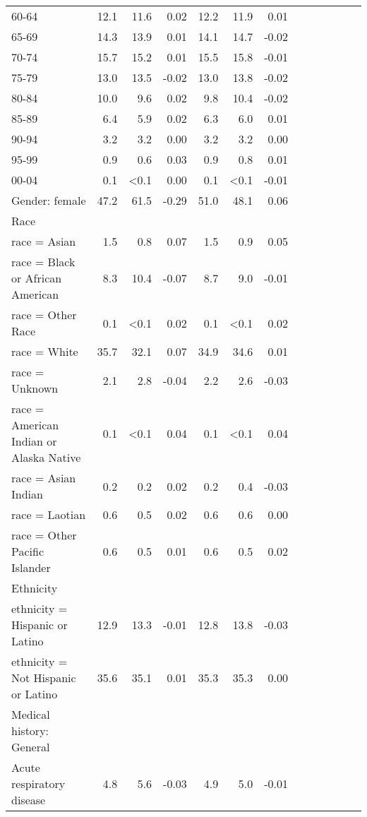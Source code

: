 \documentclass[11pt,]{article}
\begin{document}
\begin{longtable}{lrrrrrrrrrrrr}
      60-64 & 12.1 & 11.6 &  0.02 & 12.2 & 11.9 &  0.01 \\ 
      65-69 & 14.3 & 13.9 &  0.01 & 14.1 & 14.7 & -0.02 \\ 
      70-74 & 15.7 & 15.2 &  0.01 & 15.5 & 15.8 & -0.01 \\ 
      75-79 & 13.0 & 13.5 & -0.02 & 13.0 & 13.8 & -0.02 \\ 
      80-84 & 10.0 &  9.6 &  0.02 &  9.8 & 10.4 & -0.02 \\ 
      85-89 &  6.4 &  5.9 &  0.02 &  6.3 &  6.0 &  0.01 \\ 
      90-94 &  3.2 &  3.2 &  0.00 &  3.2 &  3.2 &  0.00 \\ 
      95-99 &  0.9 &  0.6 &  0.03 &  0.9 &  0.8 &  0.01 \\ 
      00-04 &  0.1 & <0.1 &  0.00 &  0.1 & <0.1 & -0.01 \\ 
  Gender: female & 47.2 & 61.5 & -0.29 & 51.0 & 48.1 &  0.06 \\ 
  Race &    &    &     &    &    &     \\ 
      race = Asian &  1.5 &  0.8 &  0.07 &  1.5 &  0.9 &  0.05 \\ 
      race = Black or African American &  8.3 & 10.4 & -0.07 &  8.7 &  9.0 & -0.01 \\ 
      race = Other Race &  0.1 & <0.1 &  0.02 &  0.1 & <0.1 &  0.02 \\ 
      race = White & 35.7 & 32.1 &  0.07 & 34.9 & 34.6 &  0.01 \\ 
      race = Unknown &  2.1 &  2.8 & -0.04 &  2.2 &  2.6 & -0.03 \\ 
      race = American Indian or Alaska Native &  0.1 & <0.1 &  0.04 &  0.1 & <0.1 &  0.04 \\ 
      race = Asian Indian &  0.2 &  0.2 &  0.02 &  0.2 &  0.4 & -0.03 \\ 
      race = Laotian &  0.6 &  0.5 &  0.02 &  0.6 &  0.6 &  0.00 \\ 
      race = Other Pacific Islander &  0.6 &  0.5 &  0.01 &  0.6 &  0.5 &  0.02 \\ 
  Ethnicity &    &    &     &    &    &     \\ 
      ethnicity = Hispanic or Latino & 12.9 & 13.3 & -0.01 & 12.8 & 13.8 & -0.03 \\ 
      ethnicity = Not Hispanic or Latino & 35.6 & 35.1 &  0.01 & 35.3 & 35.3 &  0.00 \\ 
  Medical history: General &    &    &     &    &    &     \\ 
      Acute respiratory disease &  4.8 &  5.6 & -0.03 &  4.9 &  5.0 & -0.01 \\ 

\end{longtable}
\end{document}
